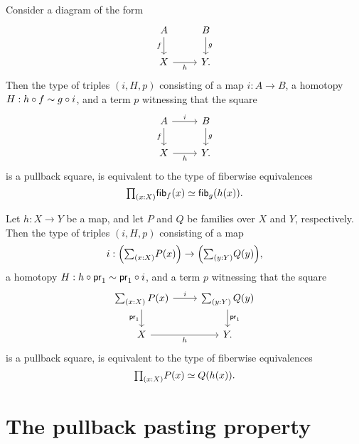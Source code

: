 \begin{thm}\label{thm:pb_fibequiv_complete}
Consider a diagram of the form
\begin{equation*}
\begin{tikzcd}
A \arrow[d,swap,"f"] & B \arrow[d,"g"] \\
X \arrow[r,swap,"h"] & Y.
\end{tikzcd}
\end{equation*}
Then the type of triples $(i,H,p)$ consisting of a map $i:A\to B$, a homotopy $H:h\circ f\sim g\circ i$, and a term $p$ witnessing that the square
\begin{equation*}
\begin{tikzcd}
A \arrow[d,swap,"f"] \arrow[r,"i"] & B \arrow[d,"g"] \\
X \arrow[r,swap,"h"] & Y.
\end{tikzcd}
\end{equation*}
is a pullback square, is equivalent to the type of fiberwise equivalences
\begin{equation*}
\prd{x:X}\eqv{\fib{f}{x}}{\fib{g}{h(x)}}.
\end{equation*}
\end{thm}

\begin{cor}\label{cor:pb_fibequiv_complete}
Let $h:X\to Y$ be a map, and let $P$ and $Q$ be families over $X$ and $Y$, respectively.
Then the type of triples $(i,H,p)$ consisting of a map 
\begin{equation*}
i:\Big(\sm{x:X}P(x)\Big)\to \Big(\sm{y:Y}Q(y)\Big),
\end{equation*}
a homotopy $H:h\circ \mathsf{pr}_{1}\sim \mathsf{pr}_{1}\circ i$, and a term $p$ witnessing that the square
\begin{equation*}
\begin{tikzcd}
\sm{x:X}P(x) \arrow[d,swap,"\proj 1"] \arrow[r,"i"] & \sm{y:Y}Q(y) \arrow[d,"\proj 1"] \\
X \arrow[r,swap,"h"] & Y.
\end{tikzcd}
\end{equation*}
is a pullback square, is equivalent to the type of fiberwise equivalences
\begin{equation*}
\prd{x:X}\eqv{P(x)}{Q(h(x))}.
\end{equation*}
\end{cor}

\section{The pullback pasting property}


